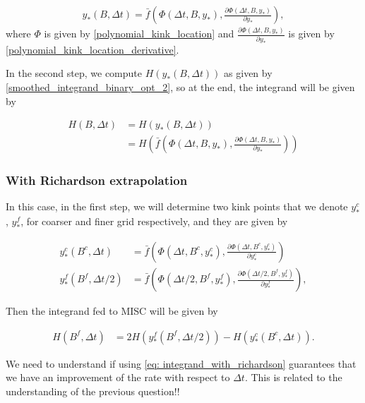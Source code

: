 \documentclass[11pt]{article}
\newcommand{\PERIOD}{.}
\newcommand{\COMMA}{,}
\begin{document}
\begin{align}\label{eq: kink_point_eq_solver}
	y_{\ast}(B,\Delta t)=\bar{f}\left(\Phi(\Delta t, B, y_{\ast} ), \frac{\partial \Phi(\Delta t, B, y_{\ast}) }{\partial y_{\ast}} \right) \COMMA
\end{align}
where $\Phi$ is given by \ref{polynomial_kink_location} and $\frac{\partial \Phi(\Delta t, B, y_{\ast} ) }{\partial y_{\ast}}$ is given by \ref{polynomial_kink_location_derivative}.


In the second step, we compute $H(y_{\ast}(B,\Delta t))$ as given by  \ref{smoothed_integrand_binary_opt_2}, so at the end, the integrand will be given by


\begin{align}\label{eq: integrand_without_richardson}
	H(B,\Delta t) &=H(y_{\ast}(B,\Delta t)) \nonumber\\
	&=H\left(\bar{f}\left(\Phi(\Delta t, B, y_{\ast} ), \frac{\partial \Phi(\Delta t, B, y_{\ast}) }{\partial y_{\ast}} \right)\right)
\end{align}





\subsubsection*{With Richardson extrapolation}

In this case, in the first step, we will determine two kink points that we denote $y_{\ast}^c$, $y_{\ast}^f$, for coarser and finer grid respectively, and they are given by

\begin{align}\label{eq: kink_point_eq_solver_richardson}
	y_{\ast}^c(B^c,\Delta t)&=\bar{f}\left(\Phi(\Delta t, B^c, y_{\ast}^c ), \frac{\partial \Phi(\Delta t, B^c, y_{\ast}^c) }{\partial y_{\ast}^c} \right) \nonumber \\
	y_{\ast}^f(B^f,\Delta t/2)&=\bar{f}\left(\Phi(\Delta t/2, B^f, y_{\ast}^f ), \frac{\partial \Phi(\Delta t/2, B^f, y_{\ast}^f) }{\partial y_{\ast}^f} \right)  \COMMA
\end{align}

Then the integrand fed to MISC will be given by 

\begin{align}\label{eq: integrand_with_richardson}
	H(B^f,\Delta t) &=2 H(y_{\ast}^f(B^f,\Delta t/2))-  H(y_{\ast}^c(B^c,\Delta t)) \PERIOD
\end{align}


We need to understand if using \ref{eq: integrand_with_richardson} guarantees that we have an improvement of the rate with respect to $\Delta t$. This is related to the understanding of  the previous question!!
\end{document}
